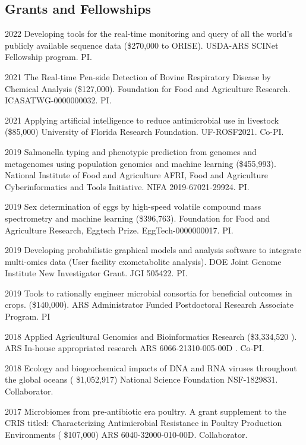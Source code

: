 \documentclass[12pt,letterpaper]{report}
\begin{document}
    \subsection*{Grants and Fellowships}

    \begin{tablist}
    	\item [2022] \tab Developing tools for the real-time monitoring and query of all the world's publicly available sequence data (\$270,000 to ORISE). USDA-ARS SCINet Fellowship program. PI.
	\item [2021] \tab The Real-time Pen-side Detection of Bovine Respiratory Disease by Chemical Analysis (\$127,000). Foundation for Food and Agriculture Research.  ICASATWG-0000000032. PI.
	\item[2021] \tab Applying artificial intelligence to reduce antimicrobial use in livestock (\$85,000) University of Florida Research Foundation.  UF-ROSF2021. Co-PI.
        \item[2019] \tab  Salmonella typing and phenotypic prediction from genomes and metagenomes using population genomics and machine learning (\$455,993). National Institute of Food and Agriculture AFRI, Food and Agriculture Cyberinformatics and Tools 		Initiative. NIFA 2019-67021-29924.  PI.
        \item[2019]\tab  Sex determination of eggs by high-speed volatile compound mass spectrometry and machine learning  (\$396,763).  Foundation for Food and Agriculture Research, Eggtech Prize.  EggTech-0000000017. PI.
        \item[2019] \tab  Developing probabilistic graphical models and analysis software to integrate multi-omics data (User facility exometabolite analysis). DOE Joint Genome Institute New Investigator Grant. JGI 505422. PI.
        \item[2019] \tab Tools to rationally engineer microbial consortia for beneficial outcomes in crops. (\$140,000). ARS Administrator Funded Postdoctoral Research Associate Program. PI
        \item[2018] \tab  Applied Agricultural Genomics and Bioinformatics Research  (\$3,334,520 ). ARS In-house appropriated research ARS 6066-21310-005-00D . Co-PI.
        \item[2018] \tab Ecology and biogeochemical impacts of DNA and RNA viruses throughout the global  oceans ( \$1,052,917)  National Science Foundation NSF-1829831. Collaborator.
        \item[2017] \tab Microbiomes from pre-antibiotic era poultry. A grant supplement to the CRIS titled: Characterizing Antimicrobial Resistance in Poultry Production Environments  ( \$107,000)  ARS 6040-32000-010-00D. Collaborator.

        
              
        
       \end{tablist} 
        
\end{document}
